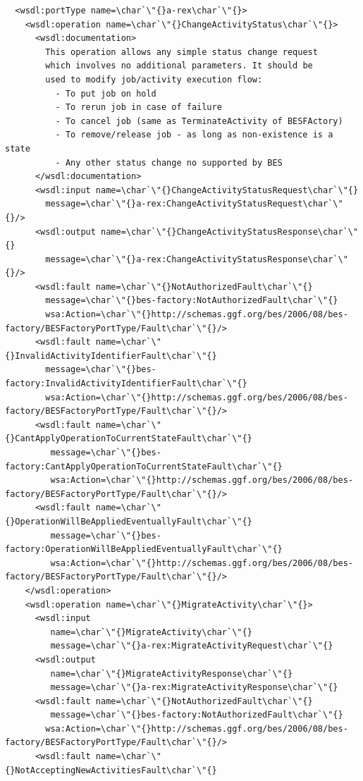 \documentclass{article}                            %
\begin{document}
\begin{footnotesize}
\begin{verbatim}
  <wsdl:portType name=\char`\"{}a-rex\char`\"{}>
    <wsdl:operation name=\char`\"{}ChangeActivityStatus\char`\"{}>
      <wsdl:documentation>
        This operation allows any simple status change request
        which involves no additional parameters. It should be
        used to modify job/activity execution flow:
          - To put job on hold
          - To rerun job in case of failure
          - To cancel job (same as TerminateActivity of BESFActory)
          - To remove/release job - as long as non-existence is a state
          - Any other status change no supported by BES
      </wsdl:documentation>
      <wsdl:input name=\char`\"{}ChangeActivityStatusRequest\char`\"{}
        message=\char`\"{}a-rex:ChangeActivityStatusRequest\char`\"{}/>
      <wsdl:output name=\char`\"{}ChangeActivityStatusResponse\char`\"{}
        message=\char`\"{}a-rex:ChangeActivityStatusResponse\char`\"{}/>
      <wsdl:fault name=\char`\"{}NotAuthorizedFault\char`\"{}
        message=\char`\"{}bes-factory:NotAuthorizedFault\char`\"{}
        wsa:Action=\char`\"{}http://schemas.ggf.org/bes/2006/08/bes-factory/BESFactoryPortType/Fault\char`\"{}/>
      <wsdl:fault name=\char`\"{}InvalidActivityIdentifierFault\char`\"{}
        message=\char`\"{}bes-factory:InvalidActivityIdentifierFault\char`\"{}
        wsa:Action=\char`\"{}http://schemas.ggf.org/bes/2006/08/bes-factory/BESFactoryPortType/Fault\char`\"{}/>
      <wsdl:fault name=\char`\"{}CantApplyOperationToCurrentStateFault\char`\"{}
         message=\char`\"{}bes-factory:CantApplyOperationToCurrentStateFault\char`\"{}
         wsa:Action=\char`\"{}http://schemas.ggf.org/bes/2006/08/bes-factory/BESFactoryPortType/Fault\char`\"{}/>
      <wsdl:fault name=\char`\"{}OperationWillBeAppliedEventuallyFault\char`\"{}
         message=\char`\"{}bes-factory:OperationWillBeAppliedEventuallyFault\char`\"{}
         wsa:Action=\char`\"{}http://schemas.ggf.org/bes/2006/08/bes-factory/BESFactoryPortType/Fault\char`\"{}/>
    </wsdl:operation>
    <wsdl:operation name=\char`\"{}MigrateActivity\char`\"{}>
      <wsdl:input 
         name=\char`\"{}MigrateActivity\char`\"{}
         message=\char`\"{}a-rex:MigrateActivityRequest\char`\"{}  
      <wsdl:output
         name=\char`\"{}MigrateActivityResponse\char`\"{}
         message=\char`\"{}a-rex:MigrateActivityResponse\char`\"{}
      <wsdl:fault name=\char`\"{}NotAuthorizedFault\char`\"{} 
         message=\char`\"{}bes-factory:NotAuthorizedFault\char`\"{}
        wsa:Action=\char`\"{}http://schemas.ggf.org/bes/2006/08/bes-factory/BESFactoryPortType/Fault\char`\"{}/>
      <wsdl:fault name=\char`\"{}NotAcceptingNewActivitiesFault\char`\"{} 

\end{verbatim}
\end{footnotesize}
\end{document}
